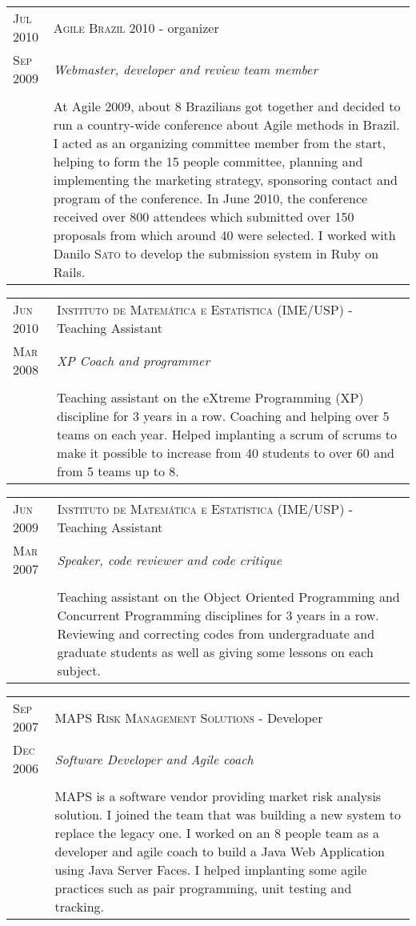 \documentclass[letter,10pt]{article}
\begin{document}
\begin{tabular}{p{2.5cm}|p{13.5cm}}
  \textsc{Jul 2010} & \textsc{Agile Brazil 2010} - organizer\\
  \textsc{Sep 2009}& \emph{Webmaster, developer and review team
    member}\\
  &\\
  &At Agile 2009, about 8 Brazilians got together and
  decided to run a country-wide conference about Agile methods in
  Brazil. I acted as an organizing committee member from the start, helping to form the
  15 people committee, planning and implementing the marketing
  strategy, sponsoring contact and program of the conference. In
  June 2010, the conference received over 800 attendees which
  submitted over 150 proposals from which around 40 were selected. I
  worked with Danilo \textsc{Sato} to develop the submission system in Ruby on
  Rails.
\end{tabular}

\begin{tabular}{p{2.5cm}|p{13.5cm}}
  \textsc{Jun 2010} & \textsc{Instituto de Matemática e Estatística
    (IME/USP)} - Teaching Assistant\\
  \textsc{Mar 2008}& \emph{XP Coach and programmer}\\
  &\\
  & Teaching assistant on the eXtreme Programming (XP) discipline for
  3 years in a row. Coaching and helping over 5 teams on each
  year. Helped implanting a scrum of scrums to make it possible to
  increase from 40 students to over 60 and from 5 teams up to 8.
\end{tabular}

\begin{tabular}{p{2.5cm}|p{13.5cm}}
  \textsc{Jun 2009} & \textsc{Instituto de Matemática e Estatística
    (IME/USP)} - Teaching Assistant\\
  \textsc{Mar 2007}& \emph{Speaker, code reviewer and code critique}\\
  &\\
  & Teaching assistant on the Object Oriented Programming and
  Concurrent Programming disciplines for
  3 years in a row. Reviewing and correcting codes from undergraduate
  and graduate students as well as giving some lessons on each subject.
\end{tabular}

\begin{tabular}{p{2.5cm}|p{13.5cm}}
  \textsc{Sep 2007} & \textsc{MAPS Risk
    Management Solutions} - Developer\\
  \textsc{Dec 2006} &\emph{Software Developer and Agile coach}\\
  &\\
  & MAPS is a software vendor providing market risk
  analysis solution. I joined the team that was building a new
  system to replace the legacy one. I worked on an 8 people team as a
  developer and agile coach to build a Java Web Application using
  Java Server Faces. I helped implanting some agile practices such as pair programming, unit
  testing and tracking.
\end{tabular}
\end{document}
